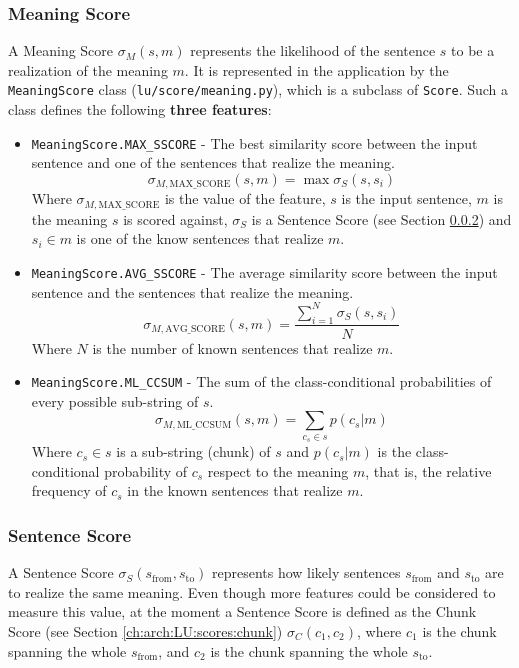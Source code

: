 \subsubsection{Meaning Score} \label{ch:arch:LU:scores:meaning}
A Meaning Score $\sigma_M(s,m)$ represents the likelihood of the sentence $s$ to be a realization of the meaning $m$. It is represented in the application by the \texttt{MeaningScore} class (\texttt{lu/score/meaning.py}), which is a subclass of \texttt{Score}. Such a class defines the following \textbf{three features}:
\begin{itemize}
	\item \texttt{MeaningScore.MAX\_SSCORE} - The best similarity score between the input sentence and one of the sentences that realize the meaning.
	\begin{displaymath}
		\sigma_{M,\text{MAX\_SCORE}}(s,m) = \max{\sigma_S(s,s_i)}
	\end{displaymath}
	Where $\sigma_{M,\text{MAX\_SCORE}}$ is the value of the feature, $s$ is the input sentence, $m$ is the meaning $s$ is scored against, $\sigma_S$ is a Sentence Score (see Section \ref{ch:arch:LU:scores:sentence}) and $s_i \in m$ is one of the know sentences that realize $m$.
	
	\item \texttt{MeaningScore.AVG\_SSCORE} - The average similarity score between the input sentence and the sentences that realize the meaning.
	 \begin{displaymath}
		\sigma_{M,\text{AVG\_SCORE}}(s,m) = \frac{\sum\limits_{i=1}^N{\sigma_S(s,s_i)}}{N}
	\end{displaymath}
	Where $N$ is the number of known sentences that realize $m$.
	
	\item \texttt{MeaningScore.ML\_CCSUM} - The sum of the class-conditional probabilities of every possible sub-string of $s$.
	 \begin{displaymath}
		\sigma_{M,\text{ML\_CCSUM}}(s,m) = \sum\limits_{c_s \in s}{p(c_s|m)}
	\end{displaymath}
	Where $c_s \in s$ is a sub-string (chunk) of $s$ and $p(c_s|m)$ is the class-conditional probability of $c_s$ respect to the meaning $m$, that is, the relative frequency of $c_s$ in the known sentences that realize $m$.
\end{itemize}

\subsubsection{Sentence Score} \label{ch:arch:LU:scores:sentence}
A Sentence Score $\sigma_S(s_\text{from},s_\text{to})$ represents how likely sentences $s_\text{from}$ and $s_\text{to}$ are to realize the same meaning.
Even though more features could be considered to measure this value, at the moment a Sentence Score is defined as the Chunk Score (see Section \ref{ch:arch:LU:scores:chunk}) $\sigma_C(c_1,c_2)$, where $c_1$ is the chunk spanning the whole $s_\text{from}$, and $c_2$ is the chunk spanning the whole $s_\text{to}$.

